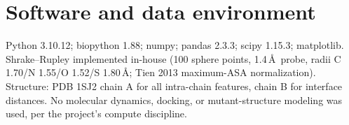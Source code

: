 \documentclass[11pt]{article}
\begin{document}
\section{Software and data environment}
Python 3.10.12; biopython 1.88; numpy; pandas 2.3.3; scipy 1.15.3; matplotlib. Shrake--Rupley implemented in-house (100 sphere points, 1.4\,\AA\ probe, radii C 1.70/N 1.55/O 1.52/S 1.80\,\AA; Tien 2013 maximum-ASA normalization). Structure: PDB 1SJ2 chain A for all intra-chain features, chain B for interface distances. No molecular dynamics, docking, or mutant-structure modeling was used, per the project's compute discipline.
\end{document}
